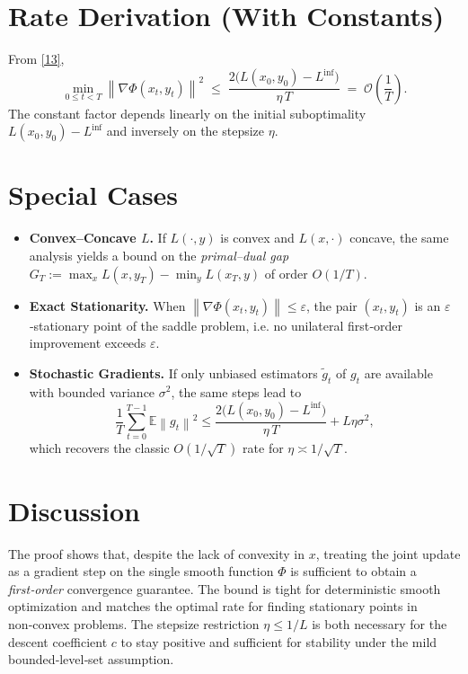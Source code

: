 \documentclass{article}
\newcommand{\norm}[1]{\left\lVert#1\right\rVert}
\begin{document}
\section*{Rate Derivation (With Constants)}
From \eqref{13},
\[
\min_{0\le t<T}\norm{\nabla\Phi(x_t,y_t)}^{2}
\;\le\;
\frac{2\bigl(L(x_0,y_0)-L^{\inf}\bigr)}{\eta\,T}
\;=\;
\mathcal{O}\!\left(\frac{1}{T}\right).
\]
The constant factor depends linearly on the initial suboptimality $L(x_0,y_0)-L^{\inf}$ and inversely on the stepsize $\eta$.

\section*{Special Cases}
\begin{itemize}
\item \textbf{Convex–Concave $L$.} If $L(\cdot,y)$ is convex and $L(x,\cdot)$ concave, the same analysis yields a bound on the \emph{primal–dual gap} $G_T:=\max_x L(x,y_T)-\min_y L(x_T,y)$ of order $O(1/T)$.
\item \textbf{Exact Stationarity.} When $\norm{\nabla\Phi(x_t,y_t)}\le\varepsilon$, the pair $(x_t,y_t)$ is an $\varepsilon$‑stationary point of the saddle problem, i.e. no unilateral first‑order improvement exceeds $\varepsilon$.
\item \textbf{Stochastic Gradients.} If only unbiased estimators $\tilde g_t$ of $g_t$ are available with bounded variance $\sigma^2$, the same steps lead to 
\[
\frac{1}{T}\sum_{t=0}^{T-1}\mathbb{E}\norm{g_t}^{2}
\le\frac{2\bigl(L(x_0,y_0)-L^{\inf}\bigr)}{\eta\,T}+L\eta\sigma^{2},
\]
which recovers the classic $O(1/\sqrt{T})$ rate for $\eta\asymp 1/\sqrt{T}$.
\end{itemize}

\section*{Discussion}
The proof shows that, despite the lack of convexity in $x$, treating the joint update as a gradient step on the single smooth function $\Phi$ is sufficient to obtain a \emph{first‑order} convergence guarantee. The bound is tight for deterministic smooth optimization and matches the optimal rate for finding stationary points in non‑convex problems. The stepsize restriction $\eta\le1/L$ is both necessary for the descent coefficient $c$ to stay positive and sufficient for stability under the mild bounded‑level‑set assumption.
\end{document}

